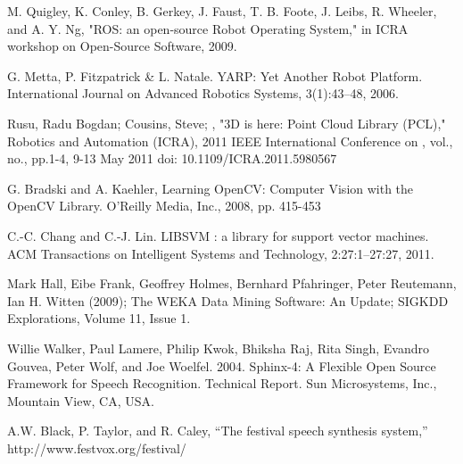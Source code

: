 \documentclass[runningheads,a4paper]{llncs}
\begin{document}
\begin{thebibliography}{99}

M. Quigley, K. Conley, B. Gerkey, J. Faust, T. B. Foote, J. Leibs, R. Wheeler, and A. Y. Ng, "ROS: an open-source Robot Operating System," in ICRA workshop on Open-Source Software, 2009.

G. Metta, P. Fitzpatrick \& L. Natale. YARP: Yet Another Robot Platform. International Journal on Advanced Robotics Systems, 3(1):43--48, 2006.

Rusu, Radu Bogdan; Cousins, Steve; , "3D is here: Point Cloud Library (PCL)," Robotics and Automation (ICRA), 2011 IEEE International Conference on , vol., no., pp.1-4, 9-13 May 2011
doi: 10.1109/ICRA.2011.5980567 

G. Bradski and A. Kaehler, Learning OpenCV: Computer Vision with the OpenCV Library. O'Reilly Media, Inc., 2008, pp. 415-453

C.-C. Chang and C.-J. Lin. LIBSVM : a library for support vector machines. ACM Transactions on Intelligent Systems and Technology, 2:27:1--27:27, 2011.

Mark Hall, Eibe Frank, Geoffrey Holmes, Bernhard Pfahringer, Peter Reutemann, Ian H. Witten (2009); The WEKA Data Mining Software: An Update; SIGKDD Explorations, Volume 11, Issue 1.

Willie Walker, Paul Lamere, Philip Kwok, Bhiksha Raj, Rita Singh, Evandro Gouvea, Peter Wolf, and Joe Woelfel. 2004. Sphinx-4: A Flexible Open Source Framework for Speech Recognition. Technical Report. Sun Microsystems, Inc., Mountain View, CA, USA.

A.W. Black, P. Taylor, and R. Caley, “The festival speech synthesis system,” http://www.festvox.org/festival/

\end{thebibliography}
\end{document}
